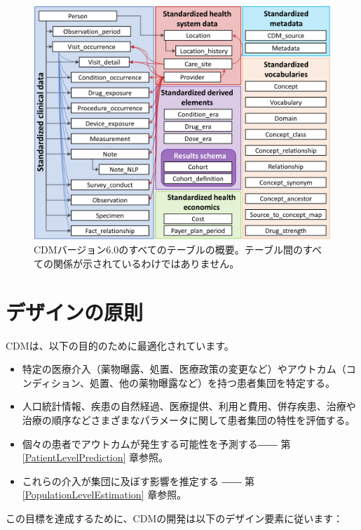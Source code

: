 \documentclass[
  11pt]{book}
\providecommand{\tightlist}{%
  \setlength{\itemsep}{0pt}\setlength{\parskip}{0pt}}
\theoremstyle{definition}
\theoremstyle{definition}
\theoremstyle{definition}
\theoremstyle{definition}
\theoremstyle{remark}
\begin{document}
\begin{figure}
\includegraphics[width=1\linewidth]{images/CommonDataModel/cdmDiagram} \caption{CDMバージョン6.0のすべてのテーブルの概要。テーブル間のすべての関係が示されているわけではありません。}\label{fig:cdmDiagram}
\end{figure}

\section{デザインの原則}\label{ux30c7ux30b6ux30a4ux30f3ux306eux539fux5247}

CDMは、以下の目的のために最適化されています。 

\begin{itemize}
\tightlist
\item
  特定の医療介入（薬物曝露、処置、医療政策の変更など）やアウトカム（コンディション、処置、他の薬物曝露など）を持つ患者集団を特定する。
\item
  人口統計情報、疾患の自然経過、医療提供、利用と費用、併存疾患、治療や治療の順序などさまざまなパラメータに関して患者集団の特性を評価する。
\item
  個々の患者でアウトカムが発生する可能性を予測する―― 第 \ref{PatientLevelPrediction} 章参照。
\item
  これらの介入が集団に及ぼす影響を推定する ―― 第 \ref{PopulationLevelEstimation} 章参照。
\end{itemize}

この目標を達成するために、CDMの開発は以下のデザイン要素に従います：
\end{document}
